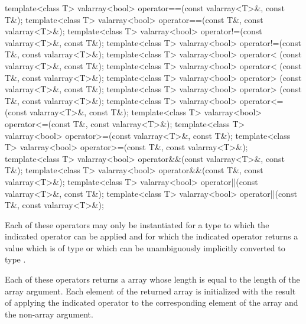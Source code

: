 %
%
%
%
%
%
%
%
%
%
%
%
%
%
%
%
\begin{itemdecl}
template<class T> valarray<bool> operator==(const valarray<T>&, const T&);
template<class T> valarray<bool> operator==(const T&, const valarray<T>&);
template<class T> valarray<bool> operator!=(const valarray<T>&, const T&);
template<class T> valarray<bool> operator!=(const T&, const valarray<T>&);
template<class T> valarray<bool> operator< (const valarray<T>&, const T&);
template<class T> valarray<bool> operator< (const T&, const valarray<T>&);
template<class T> valarray<bool> operator> (const valarray<T>&, const T&);
template<class T> valarray<bool> operator> (const T&, const valarray<T>&);
template<class T> valarray<bool> operator<=(const valarray<T>&, const T&);
template<class T> valarray<bool> operator<=(const T&, const valarray<T>&);
template<class T> valarray<bool> operator>=(const valarray<T>&, const T&);
template<class T> valarray<bool> operator>=(const T&, const valarray<T>&);
template<class T> valarray<bool> operator&&(const valarray<T>&, const T&);
template<class T> valarray<bool> operator&&(const T&, const valarray<T>&);
template<class T> valarray<bool> operator||(const valarray<T>&, const T&);
template<class T> valarray<bool> operator||(const T&, const valarray<T>&);
\end{itemdecl}

\begin{itemdescr}
\pnum
Each of these operators may only be instantiated for a type 
to which the indicated operator can be applied and for which
the indicated operator returns a value which is of type 
or which can be unambiguously implicitly converted to type .

\pnum
Each of these operators returns a  array whose
length is equal to the length of the array argument.
Each element
of the returned array is initialized with the result of applying the
indicated operator to the corresponding element of the array and the non-array argument.
\end{itemdescr}

